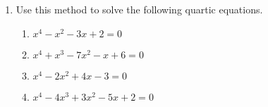 {\begin{enumerate}
\item
Use this method to solve the following quartic equations.
\begin{multicols}{2}
\begin{enumerate}

\item 
$x^4 - x^2 - 3x + 2 = 0$

\item 
$x^4 +  x^3 - 7 x^2 - x + 6 = 0$

\item 
$x^4 -2 x^2 + 4 x -3 = 0$

\item 
$x^4 - 4 x^3 + 3x^2 - 5x +2 = 0$

\end{enumerate}
\end{multicols} 
 
\end{enumerate}
 
}
 
\sagesection
 
